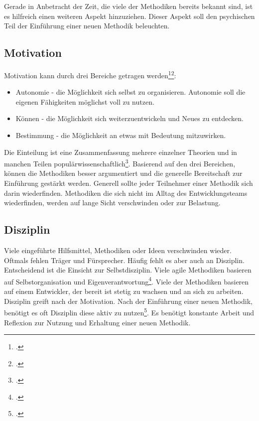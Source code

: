 Gerade in Anbetracht der Zeit, die viele der Methodiken bereits bekannt sind, ist es hilfreich einen weiteren Aspekt hinzuziehen. Dieser Aspekt soll den psychischen Teil der Einführung einer neuen Methodik beleuchten.

\subsection{Motivation}

Motivation kann durch drei Bereiche getragen werden\footcite[vgl.][]{codingame-drive}\footcite[vgl.][Kap. Autonomie ff.]{pink-drive}:
\begin{itemize}
\item Autonomie - die Möglichkeit sich selbst zu organisieren. Autonomie soll die eigenen Fähigkeiten möglichst voll zu nutzen.
\item Können - die Möglichkeit sich weiterzuentwickeln und Neues zu entdecken.
\item Bestimmung - die Möglichkeit an etwas mit Bedeutung mitzuwirken.
\end{itemize}

Die Einteilung ist eine Zusammenfassung mehrere einzelner Theorien und in manchen Teilen populärwissenschaftlich\footcite[vgl.][]{drive-scholarly-review}. Basierend auf den drei Bereichen, können die Methodiken besser argumentiert und die generelle Bereitschaft zur Einführung gestärkt werden. Generell sollte jeder Teilnehmer einer Methodik sich darin wiederfinden. Methodiken die sich nicht im Alltag des Entwicklungsteams wiederfinden, werden auf lange Sicht verschwinden oder zur Belastung.

\subsection{Disziplin}

Viele eingeführte Hilfsmittel, Methodiken oder Ideen verschwinden wieder. Oftmals fehlen Träger und Fürsprecher. Häufig fehlt es aber auch an Disziplin. Entscheidend ist die Einsicht zur Selbstdisziplin. Viele agile Methodiken basieren auf Selbstorganisation und Eigenverantwortung\footcite[vgl.][]{codingame-agile-failed}. Viele der Methodiken basieren auf einem Entwickler, der bereit ist stetig zu wachsen und an sich zu arbeiten.
Disziplin greift nach der Motivation. Nach der Einführung einer neuen Methodik, benötigt es oft Disziplin diese aktiv zu nutzen\footcite[vgl.][]{screw-motivation}. Es benötigt konstante Arbeit und Reflexion zur Nutzung und Erhaltung einer neuen Methodik.

